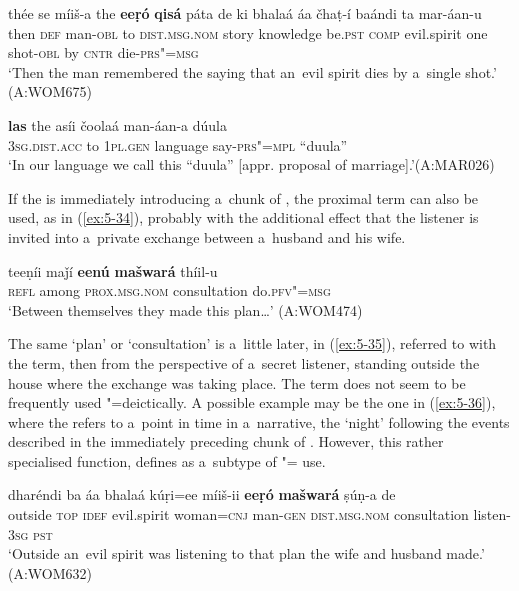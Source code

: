\begin{exe}
\ex
\label{ex:5-32}
\gll thée se míiš-a the \textbf{eeṛó} \textbf{qisá} páta de ki bhalaá áa čhaṭ-í baándi ta mar-áan-u\\
then \textsc{def} man-\textsc{obl} to \textsc{dist.msg.nom} story knowledge be.\textsc{pst} \textsc{comp} evil.spirit one shot-\textsc{obl} by \textsc{cntr} die-\textsc{prs"=msg}\\
\glt `Then the man remembered the saying that an~evil spirit dies by a~single shot.' (A:WOM675)
\end{exe}
\begin{exe}
\ex
\label{ex:5-33}
\gll \textbf{las} the asíi čoolaá man-áan-a dúula\\
\textsc{3sg}.\textsc{dist.acc} to \textsc{1pl.gen} language say-\textsc{prs"=mpl} ``duula''\\
\glt `In our language we call this ``duula'' [appr. proposal of marriage].'\newline (A:MAR026)
\end{exe}
If the  is immediately introducing a~chunk of , the proximal term can also be used, as in (\ref{ex:5-34}), probably with the additional effect that the listener is invited into a~private exchange between a~husband and his wife. 

\begin{exe}
\ex
\label{ex:5-34}
\gll teeṇíi maǰí \textbf{eenú} \textbf{mašwará} thíil-u \\
\textsc{refl} among \textsc{prox.msg.nom} consultation do.\textsc{pfv"=msg}\\
\glt `Between themselves they made this plan{\ldots}' (A:WOM474)
\end{exe}

The same `plan' or `consultation' is a~little later, in (\ref{ex:5-35}), referred to with the  term, then from the perspective of a~secret listener, standing outside the house where the exchange was taking place. The  term does not seem to be frequently used "=deictically. A possible example may be the one in (\ref{ex:5-36}), where the  refers to a~point in time in a~narrative, the `night' following the events described in the immediately preceding chunk of . However, this rather specialised function, \citet[225]{himmelmann1996} defines as a~subtype of "= use.

\ea\label{ex:5-35}
\gll dharéndi ba áa bhalaá kúṛi=ee míiš-ii \textbf{eeṛó} \textbf{mašwará} ṣúṇ-a de \\
outside \textsc{top} \textsc{idef} evil.spirit woman=\textsc{cnj} man-\textsc{gen} \textsc{dist.msg.nom} consultation listen-\textsc{3sg} \textsc{pst} \\
\glt `Outside an~evil spirit was listening to that plan the wife and husband made.' (A:WOM632)
\z

